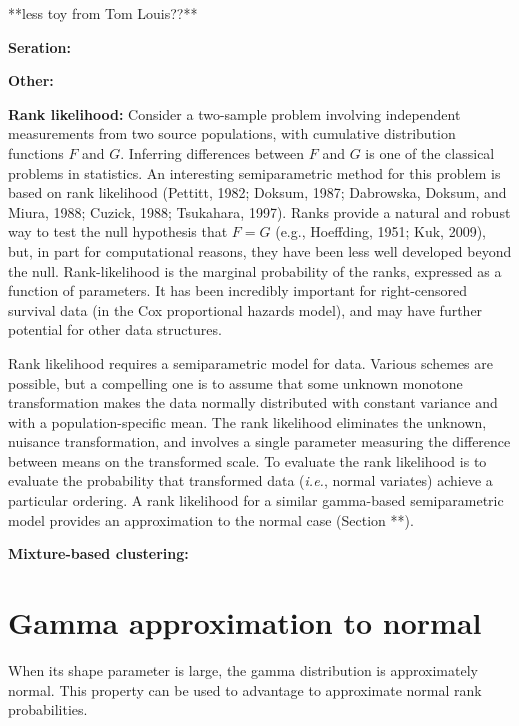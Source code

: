 **less toy from Tom Louis??**

\noindent
{\bf Seration:} 

\noindent
{\bf Other:} 


\noindent
{\bf Rank likelihood:} 
Consider a two-sample problem involving independent measurements
 from two source populations, with cumulative distribution functions
 $F$ and $G$.  Inferring differences between $F$ and $G$ is one of the 
 classical problems in statistics.  An interesting semiparametric method for
 this problem is based on rank likelihood (Pettitt, 1982; Doksum, 1987;
 Dabrowska, Doksum, and Miura, 1988; Cuzick, 1988; Tsukahara, 1997). 
  Ranks provide a natural and robust way to test the null 
 hypothesis that $F=G$ (e.g., Hoeffding, 1951; Kuk, 2009),
 but, in part for computational reasons,
 they have been less well developed beyond the null. 
 Rank-likelihood is the marginal probability of the ranks, expressed 
 as a function of parameters. It has been incredibly
 important for right-censored survival data (in the Cox proportional 
 hazards model), and may have further potential for other data structures.  

 Rank likelihood requires a semiparametric model for data.  Various 
 schemes are possible, but a compelling one is to assume that some
 unknown monotone transformation makes the data normally distributed
 with constant variance and with a population-specific mean.  The rank
 likelihood eliminates the unknown, nuisance transformation, and 
 involves a single parameter measuring the difference between 
  means on the transformed scale.
   To evaluate the rank likelihood is to evaluate the probability 
 that transformed data ({\em i.e.}, normal variates) achieve a particular
 ordering.  A rank likelihood for a similar gamma-based semiparametric
 model provides an approximation to the normal case (Section **). 

\noindent
{\bf Mixture-based clustering:}


\section{Gamma approximation to normal}

When its shape parameter is large, the gamma distribution is approximately
normal.  This property can be used to advantage to approximate
normal rank probabilities. 

